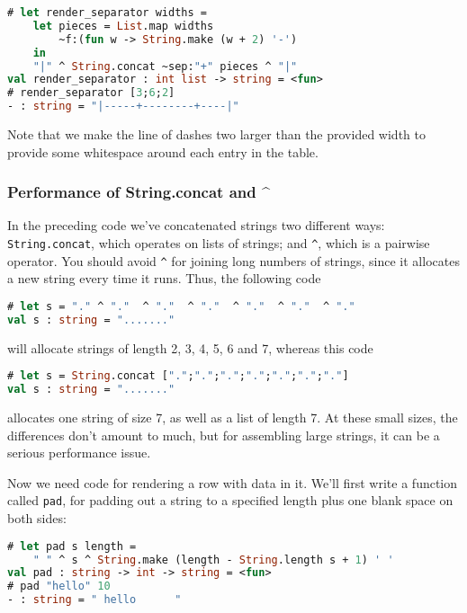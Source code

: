 \begin{lstlisting}[language=Caml]
# let render_separator widths =
    let pieces = List.map widths
        ~f:(fun w -> String.make (w + 2) '-')
    in
    "|" ^ String.concat ~sep:"+" pieces ^ "|"
val render_separator : int list -> string = <fun>
# render_separator [3;6;2]
- : string = "|-----+--------+----|"
\end{lstlisting}

Note that we make the line of dashes two larger than the provided width
to provide some whitespace around each entry in the
table.

\hypertarget{performance-of-string.concat-and}{%
\subsubsection{Performance of String.concat and
\^{}}\label{performance-of-string.concat-and}}

In the preceding code we've concatenated strings two different ways:
\passthrough{\lstinline!String.concat!}, which operates on lists of
strings; and \passthrough{\lstinline!^!}, which is a pairwise operator.
You should avoid \passthrough{\lstinline!^!} for joining long numbers of
strings, since it allocates a new string every time it runs. Thus, the
following code

\begin{lstlisting}[language=Caml]
# let s = "." ^ "."  ^ "."  ^ "."  ^ "."  ^ "."  ^ "."
val s : string = "......."
\end{lstlisting}

will allocate strings of length 2, 3, 4, 5, 6 and 7, whereas this code

\begin{lstlisting}[language=Caml]
# let s = String.concat [".";".";".";".";".";".";"."]
val s : string = "......."
\end{lstlisting}

allocates one string of size 7, as well as a list of length 7. At these
small sizes, the differences don't amount to much, but for assembling
large strings, it can be a serious performance issue.

Now we need code for rendering a row with data in it. We'll first write
a function called \passthrough{\lstinline!pad!}, for padding out a
string to a specified length plus one blank space on both
sides:

\begin{lstlisting}[language=Caml]
# let pad s length =
    " " ^ s ^ String.make (length - String.length s + 1) ' '
val pad : string -> int -> string = <fun>
# pad "hello" 10
- : string = " hello      "
\end{lstlisting}

